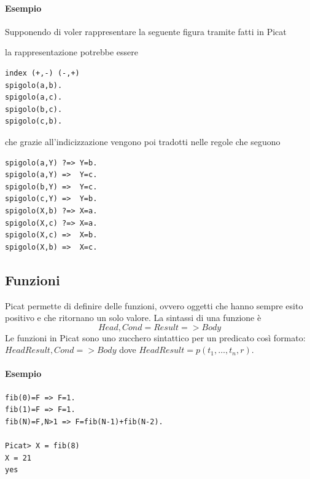 \documentclass[12pt,a4paper,openright]{book}  %
\begin{document}
\paragraph{Esempio}

Supponendo di voler rappresentare la seguente figura tramite fatti in
Picat
\begin{center}
\end{center}
la rappresentazione potrebbe essere
\begin{verbatim}
index (+,-) (-,+)
spigolo(a,b).
spigolo(a,c).
spigolo(b,c).
spigolo(c,b).
\end{verbatim}
che grazie all'indicizzazione vengono poi tradotti nelle regole che
seguono
\begin{verbatim}
spigolo(a,Y) ?=> Y=b.
spigolo(a,Y) =>  Y=c.
spigolo(b,Y) =>  Y=c.
spigolo(c,Y) =>  Y=b.
spigolo(X,b) ?=> X=a.
spigolo(X,c) ?=> X=a.
spigolo(X,c) =>  X=b.
spigolo(X,b) =>  X=c.
\end{verbatim}

\subsection{Funzioni}
\label{subsec:picat_base_func}

Picat permette di definire delle funzioni, ovvero oggetti che hanno
sempre esito positivo e che ritornano un solo valore. La sintassi di
una funzione è
\[
  Head, Cond = Result => Body
\]
Le funzioni in Picat
sono uno zucchero sintattico per un predicato così formato:
$HeadResult, Cond => Body$ dove $HeadResult = p(t_1, \ldots, t_n, r)$.

\paragraph{Esempio}
\begin{verbatim}
fib(0)=F => F=1.
fib(1)=F => F=1.
fib(N)=F,N>1 => F=fib(N-1)+fib(N-2).

Picat> X = fib(8)
X = 21
yes
\end{verbatim}
\end{document}
